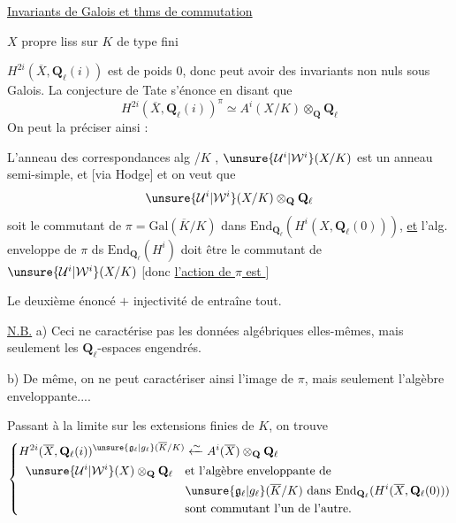 \uline{Invariants de Galois et thms de commutation}

$X$ propre liss sur $K$ de type fini

$H^{2i}(\overline{X},\mathbf{Q}_\ell(i))$ est de poids $0$, donc peut avoir des invariants non nuls sous Galois.
La conjecture de Tate s'énonce en disant que
\[
H^{2i}(\overline{X},\mathbf{Q}_\ell(i))^\pi\simeq A^i(X/K)\otimes_{\mathbf{Q}}\mathbf{Q}_\ell
\]
On peut la préciser ainsi :

L'anneau des correspondances alg /$K$  ,  $\unsure{\mathcal{U}^i|\mathcal{W}^i}(X/K)$ est un anneau semi-simple, et [via Hodge] et on veut que
\[
\unsure{\mathcal{U}^i|\mathcal{W}^i}(X/K)\otimes_{\mathbf{Q}}\mathbf{Q}_\ell
\]
soit le commutant de $\pi=\mathrm{Gal}(\overline{K}/K)$ dans $\mathrm{End}_{\mathbf{Q}_\ell}(H^i(X,\mathbf{Q}_\ell(0)))$, \uline{et} l'alg. enveloppe de $\pi$ ds $\mathrm{End}_{\mathbf{Q}_\ell}(H^i)$ doit être le commutant de $\unsure{\mathcal{U}^i|\mathcal{W}^i}(X/K)$ [donc \uline{l'action de $\pi$ est }]

Le deuxième énoncé $+$ injectivité de
entraîne tout.

\uline{N.B.} a) Ceci ne caractérise pas les données algébriques elles-mêmes, mais seulement les $\mathbf{Q}_\ell$-espaces engendrés.

b) De même, on ne peut caractériser ainsi l'image de $\pi$, mais seulement l'algèbre enveloppante....

Passant à la limite sur les extensions finies de $K$, on trouve
\[
\left\{\begin{aligned}
H^{2i}(\overline{X},\mathbf{Q}_\ell(i))^{\unsure{\mathfrak{g}_\ell|g_\ell}(\overline{K}/K)}&\xleftarrow{\sim} A^i(\overline{X})\otimes_{\mathbf{Q}}\mathbf{Q}_\ell\\
\unsure{\mathcal{U}^i|\mathcal{W}^i}(X)\otimes_{\mathbf{Q}}\mathbf{Q}_\ell\quad&\text{et l'algèbre enveloppante de}\\
&\unsure{\mathfrak{g}_\ell|g_\ell}(\overline{K}/K)\text{ dans }\mathrm{End}_{\mathbf{Q}_\ell}(H^i(\overline{X},\mathbf{Q}_\ell(0)))\\
&\text{sont commutant l'un de l'autre.}
\end{aligned}\right.
\]

